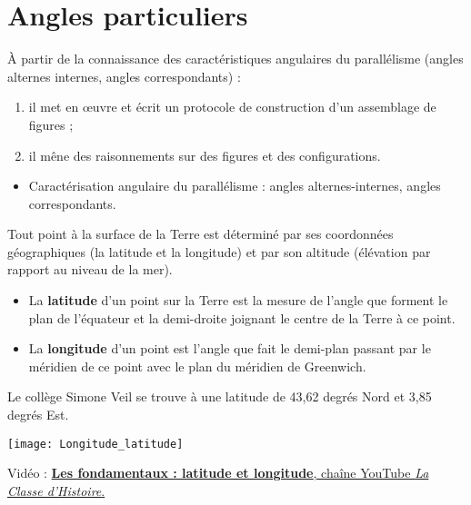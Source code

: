 \themaE
\graphicspath{{../../S02_Angles_particuliers/Images/}}

\chapter{Angles particuliers}
\label{S02}


\begin{autoeval}
   \small
   À partir de la connaissance des caractéristiques angulaires du parallélisme (angles alternes internes, angles correspondants) :\begin{enumerate}
      \item il met en \oe uvre et écrit un protocole de construction d'un assemblage de figures ;
      \item il mêne des raisonnements sur des figures et des configurations.
   \end{enumerate}
\end{autoeval}

\begin{prerequis}
   \begin{itemize}
      \item Caractérisation angulaire du parallélisme : angles alternes-internes, angles correspondants.
   \end{itemize}
\end{prerequis}

\vfill

\begin{debat}
   Tout point à la surface de la Terre est déterminé par ses coordonnées géographiques (la latitude et la longitude) et par son altitude (élévation par rapport au niveau de la mer). \\
   \begin{minipage}{10.5cm}
      \begin{itemize}
         \item La {\bf latitude} d'un point sur la Terre est la mesure de l'angle que forment le plan de l'équateur et la demi-droite joignant le centre de la Terre à ce point.
         \item La {\bf longitude} d'un point est l'angle que fait le demi-plan passant par le méridien de ce point avec le plan du méridien de Greenwich.
      \end{itemize}
      Le collège Simone Veil se trouve à une latitude de 43,62 degrés Nord et 3,85 degrés Est.
   \end{minipage}
   \hfill
   \begin{minipage}{5cm}
      \texttt{[image: Longitude\_latitude]}
   \end{minipage} 
   \bigskip
   \begin{cadre}[B2][F4]
      \begin{center}
         Vidéo : \href{https://www.youtube.com/watch?v=lpYEuHeecko}{{\bf Les fondamentaux : latitude et longitude}, chaîne YouTube {\it La Classe d'Histoire}.}
      \end{center}
   \end{cadre}
\end{debat}


